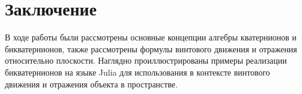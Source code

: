 \chapter{Заключение}

В ходе работы были рассмотрены основные концепции алгебры кватернионов и бикватернионов, также
рассмотрены формулы винтового движения и отражения относительно плоскости. Наглядно
проиллюстрированы примеры реализации бикватернионов на языке Julia для использования в
контексте винтового движения и отражения объекта в пространстве.
